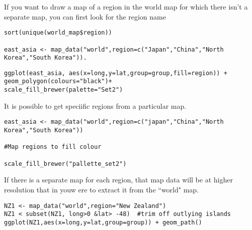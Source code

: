 \documentclass{beamer}
\begin{document}
\begin{frame}[fragile]
If you want to draw a map of a region in the world map for which there isn't a separate map, you can
first look for the region name

\begin{framed}
\begin{verbatim}
sort(unique(world_map$region))

east_asia <- map_data("world",region=c("Japan","China","North Korea","South Korea")).

\end{verbatim}
\end{framed}
\end{frame}
\begin{frame}
\begin{framed}

\begin{verbatim}
ggplot(east_asia, aes(x=long,y=lat,group=group,fill=region)) + 
geom_polygon(colours="black")+
scale_fill_brewer(palette="Set2")
\end{verbatim}
\end{framed}


\begin{frame}[fragile]
It is possible to get speciific regions from a particular map.

\begin{framed}
\begin{verbatim}
east_asia <- map_data("world",region=c("japan","China","North Korea","South Korea"))

#Map regions to fill colour

scale_fill_brewer("pallette_set2")
\end{verbatim}
\end{framed}
\end{frame}

\begin{frame}
If there is a separate map for each region, that map data will be at
higher resolution that in youw ere to extract it from the ``world" map.


\begin{framed}
\begin{verbatim}
NZ1 <- map_data("world",region="New Zealand")
NZ1 < subset(NZ1, long>0 &lat> -48)  #trim off outlying islands
ggplot(NZ1,aes(x=long,y=lat,group=group)) + geom_path()


\end{verbatim}
\end{framed}
\end{frame}
\end{frame}
\end{document}
